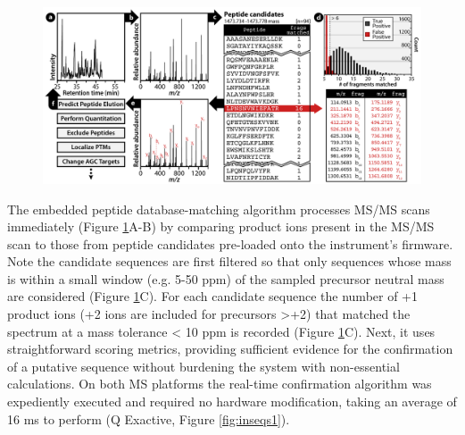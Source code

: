 \begin{figure}
	\centering
	\includegraphics[width=\columnwidth]{inseq/inSeq_Fig 1.png}
	\label{fig:inseq1}
\end{figure} 
The embedded peptide database-matching algorithm processes MS/MS scans immediately (Figure \ref{fig:inseq1}A-B) by comparing product ions present in the MS/MS scan to those from peptide candidates pre-loaded onto the instrument's firmware. Note the candidate sequences are first filtered so that only sequences whose mass is within a small window (e.g. 5-50 ppm) of the sampled precursor neutral mass are considered (Figure \ref{fig:inseq1}C). For each candidate sequence the number of +1 product ions (+2 ions are included for precursors >+2) that matched the spectrum at a mass tolerance < 10 ppm is recorded (Figure \ref{fig:inseq1}C). Next, it uses straightforward scoring metrics, providing sufficient evidence for the confirmation of a putative sequence without burdening the system with non-essential calculations. On both MS platforms the real-time confirmation algorithm was expediently executed and required no hardware modification, taking an average of 16 ms to perform (Q Exactive, Figure \ref{fig:inseqs1}).
